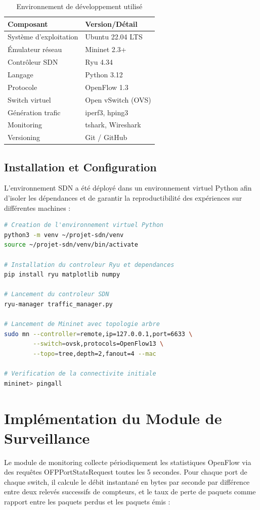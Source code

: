 \documentclass[12pt,a4paper]{report}
\begin{document}
\begin{table}[H]
\centering
\caption{Environnement de développement utilisé}
\label{tab:outils}
\begin{tabular}{ll}
\toprule
\textbf{Composant} & \textbf{Version/Détail} \\
\midrule
Système d'exploitation & Ubuntu 22.04 LTS \\
Émulateur réseau & Mininet 2.3+ \\
Contrôleur SDN & Ryu 4.34 \\
Langage & Python 3.12 \\
Protocole & OpenFlow 1.3 \\
Switch virtuel & Open vSwitch (OVS) \\
Génération trafic & iperf3, hping3 \\
Monitoring & tshark, Wireshark \\
Versioning & Git / GitHub \\
\bottomrule
\end{tabular}
\end{table}

\subsection{Installation et Configuration}
L'environnement SDN a été déployé dans un environnement
virtuel Python afin d'isoler les dépendances et de
garantir la reproductibilité des expériences sur
différentes machines :

\begin{lstlisting}[language=bash,
caption=Installation de l'environnement SDN]
# Creation de l'environnement virtuel Python
python3 -m venv ~/projet-sdn/venv
source ~/projet-sdn/venv/bin/activate

# Installation du controleur Ryu et dependances
pip install ryu matplotlib numpy

# Lancement du controleur SDN
ryu-manager traffic_manager.py

# Lancement de Mininet avec topologie arbre
sudo mn --controller=remote,ip=127.0.0.1,port=6633 \
        --switch=ovsk,protocols=OpenFlow13 \
        --topo=tree,depth=2,fanout=4 --mac

# Verification de la connectivite initiale
mininet> pingall
\end{lstlisting}

\section{Implémentation du Module de Surveillance}
Le module de monitoring collecte périodiquement les
statistiques OpenFlow via des requêtes OFPPortStatsRequest
toutes les 5 secondes. Pour chaque port de chaque switch,
il calcule le débit instantané en bytes par seconde par
différence entre deux relevés successifs de compteurs,
et le taux de perte de paquets comme rapport entre les
paquets perdus et les paquets émis :
\end{document}
